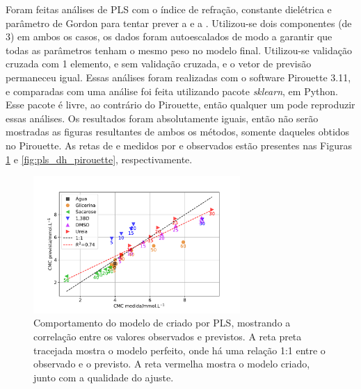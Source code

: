 		Foram feitas análises de PLS  com o índice de refração, constante dielétrica e parâmetro de Gordon para tentar prever a \cmc{} e a \DHmic. Utilizou-se dois componentes (de 3) em ambos os casos, os dados foram autoescalados de modo a garantir que todas as parâmetros tenham o mesmo peso no modelo final. Utilizou-se validação cruzada com 1 elemento, e sem validação cruzada, e o vetor de previsão permaneceu igual. Essas análises foram realizadas com o software Pirouette 3.11, e comparadas com uma análise foi feita utilizando pacote \emph{sklearn}, em Python. Esse pacote é livre, ao contrário do Pirouette, então qualquer um pode reproduzir essas análises. Os resultados foram absolutamente iguais, então não serão mostradas as figuras resultantes de ambos os métodos, somente daqueles obtidos no Pirouette. As retas de \cmc{} e \DHmic{} medidos por \cmc{} e \DHmic{} observados estão presentes nas Figuras \ref{fig:pls_cmc_pirouette} e \ref{fig:pls_dh_pirouette}, respectivamente.
		
		\begin{figure}[h]
			\centering
			\includegraphics[width=0.7\textwidth]{imagens/itc/PLS_cmc_pirouette}
			\caption{Comportamento do modelo de \cmc{} criado por PLS, mostrando a correlação entre os valores observados e previstos. A reta preta tracejada mostra o modelo perfeito, onde há uma relação 1:1 entre o observado e o previsto. A reta vermelha mostra o modelo criado, junto com a qualidade do ajuste.}
			\label{fig:pls_cmc_pirouette}
		\end{figure}
	
